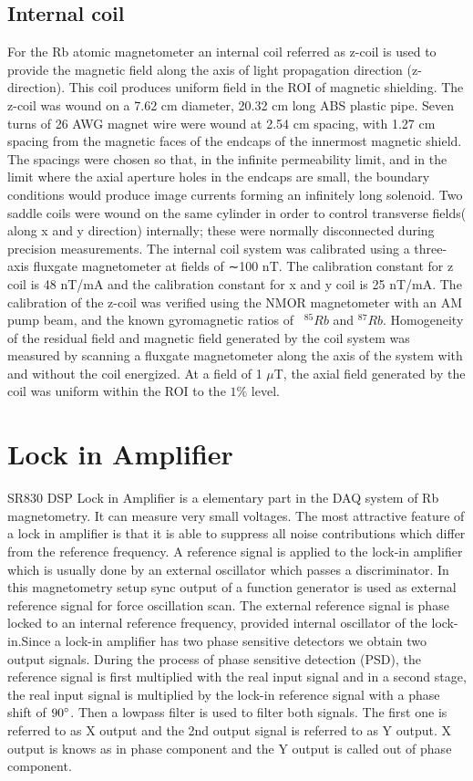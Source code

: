 \subsection{Internal coil\label{sec:Internal coil}}
 For the Rb atomic magnetometer an internal coil referred as z-coil is used to provide the magnetic field along the axis of light propagation direction (z-direction). This coil produces uniform field in the ROI  of magnetic shielding. The z-coil was wound on a 7.62 cm diameter, 20.32 cm long ABS plastic pipe. Seven turns of 26 AWG magnet wire were wound at 2.54 cm spacing, with 1.27 cm spacing from the magnetic faces of the endcaps of the innermost magnetic shield. The spacings were chosen so that, in the infinite permeability limit, and in the limit where the axial aperture holes in the endcaps are small, the boundary conditions would produce image currents forming an infinitely long solenoid. Two saddle coils were wound on the same cylinder in order to control transverse fields( along x and y direction) internally; these were normally disconnected during precision measurements. The internal coil system was calibrated using a three-axis fluxgate magnetometer at fields of ∼100 nT.  The calibration constant for z coil is 48 nT/mA and the calibration constant for x and y coil is 25 nT/mA. The calibration of the z-coil was verified using the NMOR magnetometer with an AM pump beam, and the known gyromagnetic ratios of~ $^{85}Rb$ and $^{87}Rb$. Homogeneity of the residual field and magnetic field generated by the coil system was measured by scanning a fluxgate magnetometer along the axis of the system with and without the coil energized. At a field of 1 $\mu$T, the axial field generated by the coil was uniform within the ROI to the $1\%$  level.


\section{Lock in Amplifier}
SR830 DSP Lock in Amplifier is a elementary part in the DAQ system of Rb magnetometry. It can measure very  small voltages. The most attractive feature of a lock in amplifier is that it is able to suppress all noise contributions which differ from the reference frequency. A reference signal is applied to the lock-in amplifier which is usually done by an external oscillator which passes a discriminator. In this magnetometry setup sync output of a function generator is used as external reference signal for force oscillation scan. The external reference signal is phase locked to an internal reference frequency, provided internal oscillator of the lock-in.Since a lock-in amplifier has two phase sensitive detectors we obtain two output signals. During the process of phase sensitive detection (PSD), the reference signal is first multiplied with the real input signal  and in a second stage, the real input signal is multiplied by
the lock-in reference signal with a phase shift of $90\degree$. Then a lowpass filter is used to filter both signals. The first one is referred to as X output and the 2nd output signal is referred to as Y output. X output is knows as in phase component and the Y output is called out of phase component.



